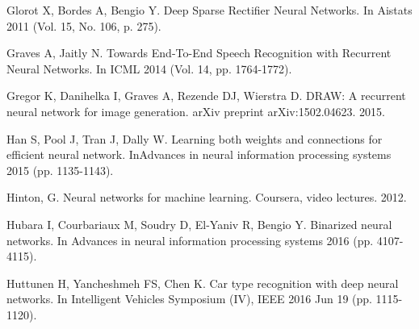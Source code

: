 \documentclass[conference,compsoc]{IEEEtran}
\begin{document}
\begin{thebibliography}{99}



  Glorot X, Bordes A, Bengio Y. Deep Sparse Rectifier Neural Networks. In Aistats 2011 (Vol. 15, No. 106, p. 275).
 \label{refRELU}


\bibitem{}
Graves A, Jaitly N. Towards End-To-End Speech Recognition with Recurrent Neural Networks. In ICML 2014 (Vol. 14, pp. 1764-1772).
\label{speechrecognition}


Gregor K, Danihelka I, Graves A, Rezende DJ, Wierstra D. DRAW: A recurrent neural network for image generation. arXiv preprint arXiv:1502.04623. 2015.
\label{DRAW}







\bibitem{}
Han S, Pool J, Tran J, Dally W. Learning both weights and connections for efficient neural network. InAdvances in neural information processing systems 2015 (pp. 1135-1143).
\label{refPruning}

\bibitem{}
Hinton, G. Neural networks for machine learning. Coursera, video lectures. 2012.
\label{refSTE}

\bibitem{}
Hubara I, Courbariaux M, Soudry D, El-Yaniv R, Bengio Y. Binarized neural networks. In Advances in neural information processing systems 2016 (pp. 4107-4115).
\label{refBinNet}

\bibitem{}
Huttunen H, Yancheshmeh FS, Chen K. Car type recognition with deep neural networks. In Intelligent Vehicles Symposium (IV), IEEE 2016 Jun 19 (pp. 1115-1120).
\label{refHeikkiCar}



\end{thebibliography}
\end{document}

